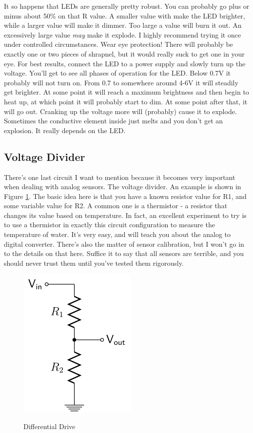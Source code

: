 It so happens that LEDs are generally pretty robust. You can probably go plus or minus about 50\% on that R value. A smaller value with make the LED brighter, while a larger value will make it dimmer. Too large a value will burn it out. An excessively large value \textit{may} make it explode. I highly recommend trying it once under controlled circumstances. Wear eye protection! There will probably be exactly one or two pieces of shrapnel, but it would really suck to get one in your eye. For best results, connect the LED to a power supply and slowly turn up the voltage. You'll get to see all phases of operation for the LED. Below 0.7V it probably will not turn on. From 0.7 to somewhere around 4-6V it will steadily get brighter. At some point it will reach a maximum brightness and then begin to heat up, at which point it will probably start to dim. At some point after that, it will go out. Cranking up the voltage more will (probably) cause it to explode. Sometimes the conductive element inside just melts and you don't get an explosion. It really depends on the LED.

\subsection{Voltage Divider}

There's one last circuit I want to mention because it becomes very important when dealing with analog sensors. The voltage divider. An example is shown in Figure \ref{fig:voltagedivider}. The basic idea here is that you have a known resistor value for R1, and some variable value for R2. A common one is a thermistor - a resistor that changes its value based on temperature. In fact, an excellent experiment to try is to use a thermistor in exactly this circuit configuration to measure the temperature of water. It's very easy, and will teach you about the analog to digital converter. There's also the matter of sensor calibration, but I won't go in to the details on that here. Suffice it to say that all sensors are terrible, and you should never trust them until you've tested them rigorously.

\begin{figure}[h]
\centering
\includegraphics[scale=0.75]{voltagedivider.png}
\label{fig:voltagedivider}
\caption{Differential Drive}
\end{figure}

